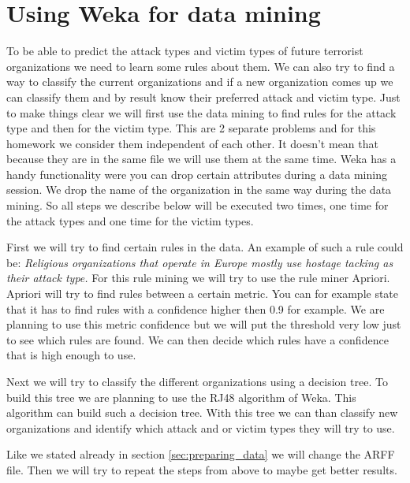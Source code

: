 \documentclass[a4]{article}
\begin{document}
\section{Using Weka for data mining}
\label{sec:weka}
To be able to predict the attack types and victim types of future terrorist organizations we need to learn some rules about them. We can also try to find a way to classify the current organizations and if a new organization comes up we can classify them and by result know their preferred attack and victim type. Just to make things clear we will first use the data mining to find rules for the attack type and then for the victim type. This are 2 separate problems and for this homework we consider them independent of each other. It doesn't mean that because they are in the same file we will use them at the same time. Weka has a handy functionality were you can drop certain attributes during a data mining session. We drop the name of the organization in the same way during the data mining. So all steps we describe below will be executed two times, one time for the attack types and one time for the victim types.\par
First we will try to find certain rules in the data. An example of such a rule could be: \textit{Religious organizations that operate in Europe mostly use hostage tacking as their attack type.} For this rule mining we will try to use the rule miner Apriori. Apriori will try to find rules between a certain metric. You can for example state that it has to find rules with a confidence higher then 0.9 for example. We are planning to use this metric confidence but we will put the threshold very low just to see which rules are found. We can then decide which rules have a confidence that is high enough to use.\par
Next we will try to classify the different organizations using a decision tree. To build this tree we are planning to use the RJ48 algorithm of Weka. This algorithm can build such a decision tree. With this tree we can than classify new organizations and identify which attack and or victim types they will try to use.\par
Like we stated already in section \ref{sec:preparing_data} we will change the ARFF file. Then we will try to repeat the steps from above to maybe get better results.
\end{document}
